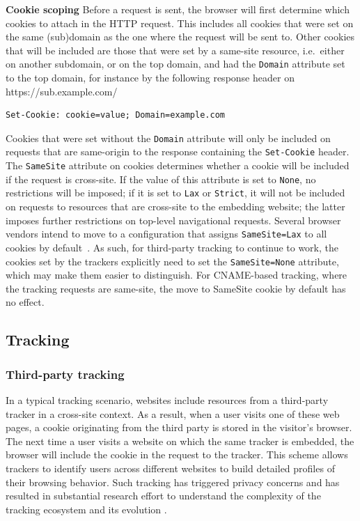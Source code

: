 \textbf{Cookie scoping}
Before a request is sent, the browser will first determine which cookies to attach in the HTTP request. 
This includes all cookies that were set on the same (sub)domain as the one where the request will be sent to.
Other cookies that will be included are those that were set by a same-site resource, i.e.\ either on another subdomain, or on the top domain, and had the \texttt{Domain} attribute set to the top domain, for instance by the following response header on https://sub.example.com/
\begin{lstlisting}[basicstyle=\ttfamily\footnotesize,]
Set-Cookie: cookie=value; Domain=example.com
\end{lstlisting}
Cookies that were set without the \texttt{Domain} attribute will only be included on requests that are same-origin to the response containing the \texttt{Set-Cookie} header.
The \texttt{SameSite} attribute on cookies determines whether a cookie will be included if the request is cross-site.
If the value of this attribute is set to \texttt{None}, no restrictions will be imposed; if it is set to \texttt{Lax} or \texttt{Strict}, it will not be included on requests to resources that are cross-site to the embedding website; the latter imposes further restrictions on top-level navigational requests.
Several browser vendors intend to move to a configuration that assigns \texttt{SameSite=Lax} to all cookies by default~\cite{chromiumsamesite,draft-west-cookie-incrementalism-01,firefoxsamesitelaxdefault}.
As such, for third-party tracking to continue to work, the cookies set by the trackers explicitly need to set the \texttt{SameSite=None} attribute, which may make them easier to distinguish.
For CNAME-based tracking, where the tracking requests are same-site, the move to SameSite cookie by default has no effect.

\subsection{Tracking}
\subsubsection{Third-party tracking}
In a typical tracking scenario, websites include resources from a third-party tracker in a cross-site context.
As a result, when a user visits one of these web pages, a cookie originating from the third party is stored in the visitor's browser.
The next time a user visits a website on which the same tracker is embedded, the browser will include the cookie in the request to the tracker.
This scheme allows trackers to identify users across different websites to build detailed profiles of their browsing behavior.
Such tracking has triggered privacy concerns and has resulted in substantial research effort to understand the complexity of the tracking ecosystem \cite{mayer2012third,englehardt2015cookies} and its evolution \cite{lerner2016internet}.


